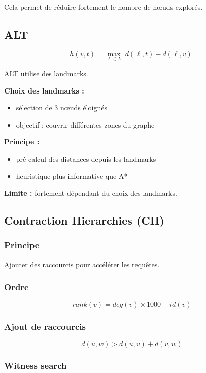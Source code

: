 \documentclass[11pt]{article}
\begin{document}
Cela permet de réduire fortement le nombre de nœuds explorés.

\subsection{ALT}

\[
h(v,t)=\max_{\ell \in L} |d(\ell,t)-d(\ell,v)|
\]

ALT utilise des landmarks.

\textbf{Choix des landmarks :}
\begin{itemize}
\item sélection de 3 nœuds éloignés
\item objectif : couvrir différentes zones du graphe
\end{itemize}

\textbf{Principe :}
\begin{itemize}
\item pré-calcul des distances depuis les landmarks
\item heuristique plus informative que A*
\end{itemize}

\textbf{Limite :}
fortement dépendant du choix des landmarks.

\subsection{Contraction Hierarchies (CH)}

\subsubsection{Principe}

Ajouter des raccourcis pour accélérer les requêtes.

\subsubsection{Ordre}

\[
rank(v)=deg(v)\times 1000 + id(v)
\]

\subsubsection{Ajout de raccourcis}

\[
d(u,w) > d(u,v)+d(v,w)
\]

\subsubsection{Witness search}
\end{document}

